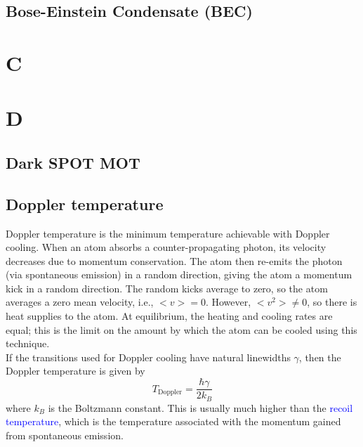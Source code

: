 \documentclass{book}
\theoremstyle{definition}
\newcommand{\f}[2]{\frac{#1}{#2}}
\begin{document}
\section*{Bose-Einstein Condensate (BEC)}









\chapter*{C}
\chapter*{D}



\section*{Dark SPOT MOT}





\section*{Doppler temperature}


Doppler temperature is the minimum temperature achievable with Doppler cooling. When an atom absorbs a counter-propagating photon, its velocity decreases due to momentum conservation. The atom then re-emits the photon (via spontaneous emission) in a random direction, giving the atom a momentum kick in a random direction. The random kicks average to zero, so the atom averages a zero mean velocity, i.e., $< v > = 0$. However, $<v^2> \neq 0$, so there is heat supplies to the atom. At equilibrium, the heating and cooling rates are equal; this is the limit on the amount by which the atom can be cooled using this technique. \\

If the transitions used for Doppler cooling have natural linewidths $\gamma$, then the Doppler temperature is given by 
\begin{equation*}
T_\text{Doppler} = \f{\hbar \gamma}{2k_B}
\end{equation*} 
where $k_B$ is the Boltzmann constant. This is usually much higher than the \textcolor{blue}{recoil temperature}, which is the temperature associated with the momentum gained from spontaneous emission. 
\end{document}
